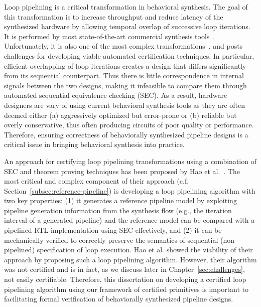 Loop pipelining is a critical transformation in behavioral
synthesis. The goal of this transformation is to increase
throughput and reduce latency of the synthesized hardware by
allowing temporal overlap of successive loop iterations. It
is performed by most state-of-the-art commercial 
synthesis tools~\cite{forte,vivado,legup}.
Unfortunately, it is also one of the most complex transformations~\cite{tl:software-popl10},
and posts challenges for developing viable automated certification
techniques. In particular, efficient overlapping of loop
iterations creates a design that differs significantly from
its sequential counterpart. Thus there is little
correspondence in internal signals between the two designs,
making it infeasible to compare them through automated
sequential equivalence checking (SEC).
As a result, hardware designers are vary of using current behavioral synthesis tools as
they are often deemed either (a) aggressively optimized but error-prone or (b) reliable but overly conservative,
thus often producing circuits of poor quality
or performance. Therefore, ensuring
correctness of behaviorally synthesized pipeline designs
is a critical issue in bringing behavioral synthesis into practice.

An approach for certifying loop pipelining transformations
using a combination of SEC and theorem proving techniques
has been proposed by Hao et al.~\cite{hrx:dac-12}. The most critical and complex
component of their approach (c.f. Section~\ref{subsec:reference-pipeline}) is developing
a loop pipelining algorithm with two key properties: (1) it generates a reference pipeline model by exploiting
pipeline generation information from the synthesis flow (e.g., the iteration interval of a generated pipeline) 
and the reference model can be compared with a pipelined RTL implementation using SEC effectively, and (2) it
can be mechanically verified to correctly preserve the semantics of
sequential (non-pipelined) specification of loop execution.
Hao et al. showed the viability of their approach by proposing such a loop pipelining algorithm.
However, their algorithm was not certified and is in fact, as we discuss later in Chapter~\ref{sec:challenges},
not easily certifiable. Therefore, this dissertation on developing a certified loop pipelining algorithm using our framework of certified primitives is important to facilitating formal verification of behaviorally synthesized pipeline designs.

